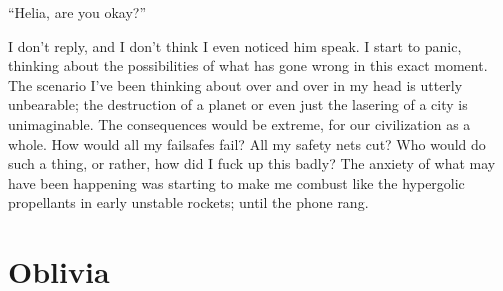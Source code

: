 \documentclass{book}
\begin{document}
			``Helia, are you okay?''

			I don't reply, and I don't think I even noticed him speak. I start to panic, thinking
			about the possibilities of what has gone wrong in this exact moment. The scenario I've
			been thinking about over and over in my head is utterly unbearable; the destruction of
			a planet or even just the lasering of a city is unimaginable. The consequences would be
			extreme, for our civilization as a whole. How would all my failsafes fail? All my
			safety nets cut? Who would do such a thing, or rather, how did I fuck up this badly?
			The anxiety of what may have been happening was starting to make me combust like the
			hypergolic propellants in early unstable rockets; until the phone rang.



		\chapter{Oblivia}
\end{document}
